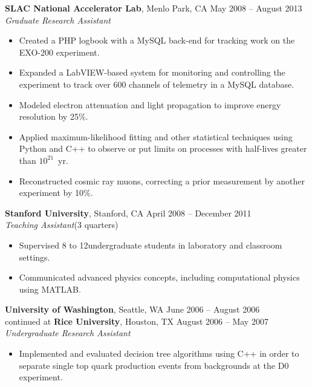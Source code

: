 \documentclass[margin,line]{resume}
\begin{document}
\begin{resume}
    \textbf{SLAC National Accelerator Lab}, Menlo Park, CA \hfill May 2008 -- August 2013\vspace{1mm}\\\vspace{1mm}%
    \textsl{Graduate Research Assistant}
    \begin{itemize}
    \item Created a PHP logbook with a MySQL back-end for tracking work on the EXO-200 experiment.
    \item Expanded a LabVIEW-based system for monitoring and controlling the experiment to track over 600 channels of telemetry in a MySQL database.
    \item Modeled electron attenuation and light propagation to improve energy resolution by 25\%.
    \item Applied maximum-likelihood fitting and other statistical techniques using Python and C++ to observe or put limits on processes with half-lives greater than \(10^{21}\)~yr.
    \item Reconstructed cosmic ray muons, correcting a prior measurement by another experiment by 10\%.
    \end{itemize}
    
    \textbf{Stanford University}, Stanford, CA \hfill April 2008 -- December 2011 \vspace{0mm}\\
    \textsl{Teaching Assistant}\hfill (3 quarters)%
    \begin{itemize}
    \item Supervised 8 to 12undergraduate students in laboratory and classroom settings.
    \item Communicated advanced physics concepts, including computational physics using MATLAB.
    \end{itemize}
    
    \textbf{University of Washington}, Seattle, WA \hfill June 2006 -- August 2006 \vspace{0mm}\\
    continued at \textbf{Rice University}, Houston, TX \hfill August 2006 -- May 2007 \vspace{1mm}\\\vspace{1mm}%
    \textsl{Undergraduate Research Assistant}
    \begin{itemize}
    \item Implemented and evaluated decision tree algorithms using C++ in order to separate single top quark production events from backgrounds at the D0 experiment.
    \end{itemize}
 

\end{resume}
\end{document}
